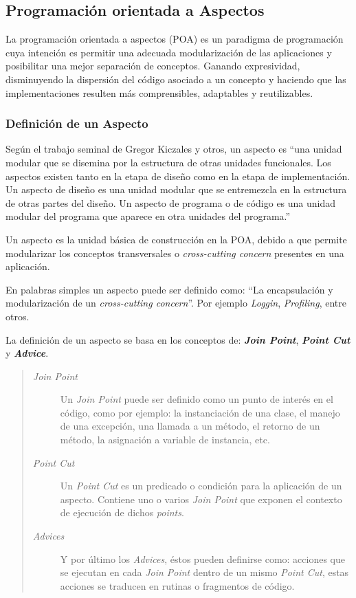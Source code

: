 \subsection{Programación orientada a Aspectos}

	La programación orientada a aspectos (POA) es un paradigma de programación cuya
	intención es permitir una adecuada modularización de las aplicaciones
	y posibilitar una mejor separación de conceptos. Ganando expresividad,
	disminuyendo la dispersión del código asociado a un concepto y haciendo que
	las implementaciones resulten más comprensibles, adaptables y reutilizables.


\subsubsection{Definición de un Aspecto}
	Según el trabajo seminal de Gregor Kiczales y otros, un aspecto es 
	``una unidad modular que se disemina por la estructura de
	otras unidades funcionales. Los aspectos existen tanto en la etapa de
	diseño como en la etapa de implementación. Un aspecto de diseño es
	una unidad modular que se entremezcla en la estructura de otras partes
	del diseño. Un aspecto de programa o de código es una unidad modular
	del programa que aparece en otra unidades del programa.'' \cite{Kicz97a}

	\bigskip
	
	Un aspecto es la unidad básica de construcción en la POA, debido a que permite
	modularizar los conceptos transversales o \emph{cross-cutting concern} presentes en una aplicación.
	
	En palabras simples un aspecto puede ser definido como: ``La encapsulación y
	modularización de un \emph{cross-cutting concern}''. Por ejemplo
	\emph{Loggin}, \emph{Profiling}, entre otros.
	
	
	La definición de un aspecto se basa en los conceptos de: {\bf \emph{Join
	Point}}, {\bf \emph{ Point Cut}} y {\bf \emph{ Advice}}.
	
	\begin{quote}
	
	\begin{description}
		\item[\emph{Join Point}] Un \emph{Join Point} puede ser definido como un punto
		de interés en el código, como por ejemplo: la instanciación de una clase, el manejo de una
		excepción, una llamada a un método, el retorno de un método, la asignación a variable de instancia, etc.
		
		\item[\emph{Point Cut}] Un \emph{Point Cut} es un predicado o condición para la aplicación de un aspecto.
		 Contiene uno o varios \emph{Join Point} que exponen el contexto de ejecución de dichos \emph{points}.
		
		\item[\emph{Advices}] Y por último los \emph{Advices}, éstos pueden definirse
		como: acciones que se ejecutan en cada \emph{Join Point} dentro de un mismo
		\emph{Point Cut}, estas acciones se traducen en rutinas o fragmentos de
		código.
	
	\end{description}
	\end{quote}
	
	
